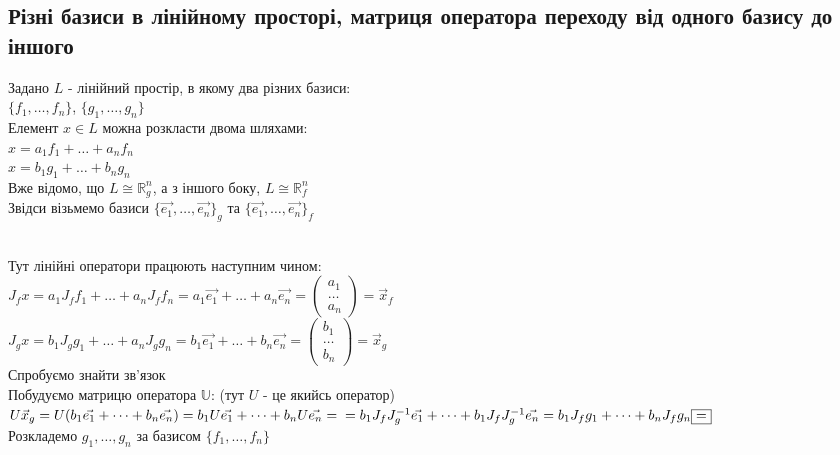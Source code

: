 \documentclass[a4paper, 14pt]{extarticle}
\begin{document}
\subsection{Різні базиси в лінійному просторі, матриця оператора переходу від одного базису до іншого}
Задано $L$ - лінійний простір, в якому два різних базиси: \\ $\{f_1,\dots,f_n\}$, $\{g_1,
\dots,g_n\}$\\
Елемент $x \in L$ можна розкласти двома шляхами:\\
$x = a_1 f_1 + \dots + a_n f_n$\\
$x = b_1 g_1 + \dots + b_n g_n$\\
Вже відомо, що $L \cong \mathbb{R}^n_g$, а з іншого боку, $L \cong \mathbb{R}^n_f$\\
Звідси візьмемо базиси $\{\vec{e_1},\dots, \vec{e_n}\}_g$ та $\{\vec{e_1},\dots, \vec{e_n}\}_f$
\\
\\
Тут лінійні оператори працюють наступним чином:\\
$J_f x = a_1 J_f f_1 + \dots + a_n J_f f_n = a_1 \vec{e_1} + \dots + a_n \vec{e_n} = \begin{pmatrix}
a_1 \\ \dots \\ a_n
\end{pmatrix} = \vec{x}_f$\\
$J_g x = b_1 J_g g_1 + \dots + a_n J_g g_n = b_1 \vec{e_1} + \dots + b_n \vec{e_n} = \begin{pmatrix}
b_1 \\ \dots \\ b_n
\end{pmatrix} = \vec{x}_g $\\
Спробуємо знайти зв'язок\\
Побудуємо матрицю оператора $\mathbb{U}$: (тут $U$ - це якийсь оператор)\\
$U \vec{x}_g = U(b_1 \vec{e_1} + \dots + b_n \vec{e_n}) = b_1 U\vec{e_1} + \dots + b_n U\vec{e_n} =\\ = b_1 J_f J_g^{-1} \vec{e_1} + \dots + b_1 J_f J_g^{-1} \vec{e_n} = b_1 J_f g_1 + \dots + b_n J_f g_n \boxed{=} $\\
Розкладемо $g_1,\dots,g_n$ за базисом $\{f_1,\dots, f_n\}$\\
\end{document}
